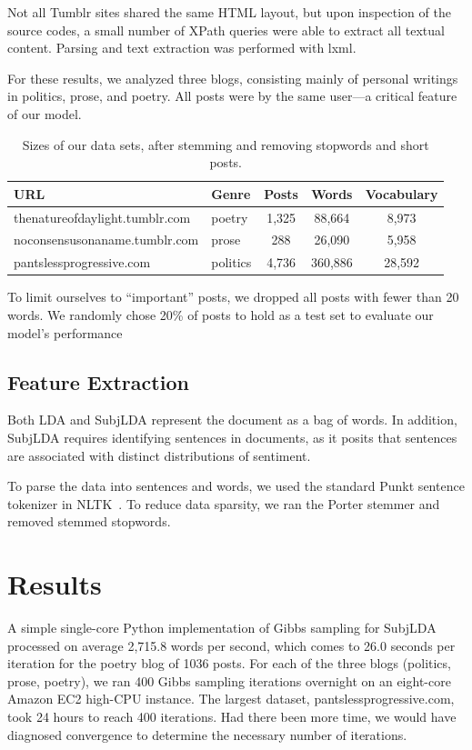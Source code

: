 \documentclass{article}
\begin{document}
Not all Tumblr sites shared the same HTML layout, but upon inspection
of the source codes, a small number of XPath queries were able to
extract all textual content.  Parsing and text extraction was
performed with lxml.

For these results, we analyzed three blogs, consisting mainly of
personal writings in politics, prose, and poetry. All posts were
by the same user---a critical feature of our model.

\begin{table} 
\centering
\begin{tabular}{ l l c c c }
\bf URL & \bf Genre & \bf Posts & \bf Words & \bf Vocabulary \\
\hline
thenatureofdaylight.tumblr.com & poetry & 1,325 & 88,664 & 8,973 \\
noconsensusonaname.tumblr.com & prose & 288 & 26,090 & 5,958 \\
pantslessprogressive.com & politics & 4,736 & 360,886 & 28,592 \\
\end{tabular}
\caption{Sizes of our data sets, after stemming and removing stopwords and short posts.\label{tab:data}}
\end{table}

To limit ourselves to ``important'' posts, we dropped all posts
with fewer than 20 words. We randomly chose 20\% of posts to hold
as a test set to evaluate our model's performance

\subsection{Feature Extraction}
Both LDA and SubjLDA represent the document as a bag of words.  In
addition, SubjLDA requires identifying sentences in documents, as
it posits that sentences are associated with distinct distributions
of sentiment.

To parse the data into sentences and words, we used the standard
Punkt sentence tokenizer in NLTK~\citep{bird09}. To reduce data
sparsity, we ran the Porter stemmer and removed stemmed stopwords.

\section{Results} 
A simple single-core Python implementation of Gibbs sampling for
SubjLDA processed on average 2,715.8 words per second, which comes
to 26.0 seconds per iteration for the poetry blog of 1036 posts.
For each of the three blogs (politics, prose, poetry), we ran 400
Gibbs sampling iterations overnight on an eight-core Amazon EC2
high-CPU instance. The largest dataset, pantslessprogressive.com,
took 24 hours to reach 400 iterations. Had there been more time,
we would have diagnosed convergence to determine the necessary
number of iterations.
\end{document}
